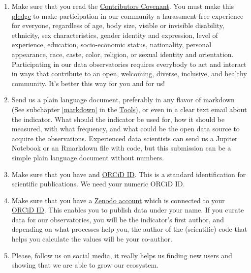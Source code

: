 \documentclass[
  a4paper,
  openany, a4paper, oneside]{book}
\begin{document}
\begin{enumerate}
\def\labelenumi{\arabic{enumi}.}
\item
  Make sure that you read the \href{https://www.contributor-covenant.org/}{Contributors Covenant}. You must make this \href{https://www.contributor-covenant.org/version/2/0/code_of_conduct/}{pledge} to make participation in our community a harassment-free experience for everyone, regardless of age, body size, visible or invisible disability, ethnicity, sex characteristics, gender identity and expression, level of experience, education, socio-economic status, nationality, personal appearance, race, caste, color, religion, or sexual identity and orientation. Participating in our data observatories requires everybody to act and interact in ways that contribute to an open, welcoming, diverse, inclusive, and healthy community. It's better this way for you and for us!
\item
  Send us a plain language document, preferably in any flavor of markdown (See subchapter \ref{markdown} in the \protect\hyperlink{markdown}{Tools}), or even in a clear text email about the indicator. What should the indicator be used for, how it should be measured, with what frequency, and what could be the open data source to acquire the observations. Experienced data scientists can send us a Jupiter Notebook or an Rmarkdown file with code, but this submission can be a simple plain language document without numbers.
\item
  Make sure that you have and \href{https://orcid.org/}{ORCiD ID}. This is a standard identification for scientific publications. We need your numeric ORCiD ID.
\item
  Make sure that you have a \href{https://zenodo.org/}{Zenodo account} which is connected to your \href{https://orcid.org/}{ORCiD ID}. This enables you to publish data under your name. If you curate data for our observatories, you will be the indicator's first author, and depending on what processes help you, the author of the (scientific) code that helps you calculate the values will be your co-author.
\item
  Please, follow us on social media, it really helps us finding new users and showing that we are able to grow our ecosystem.
\end{enumerate}
\end{document}

